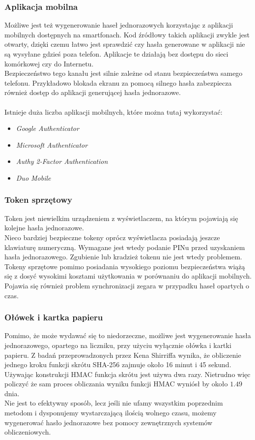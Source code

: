 \subsubsection{Aplikacja mobilna}
Możliwe jest też wygenerowanie haseł jednorazowych korzystając z aplikacji mobilnych 
dostępnych na smartfonach. Kod źródłowy takich aplikacji zwykle jest otwarty, dzięki czemu 
łatwo jest sprawdzić czy hasła generowane w aplikacji nie są wysyłane gdzieś poza telefon. 
Aplikacje te działają bez dostępu do sieci komórkowej czy do Internetu. \\
Bezpieczeństwo tego kanału jest silnie zależne od stanu bezpieczeństwa samego telefonu. 
Przykładowo blokada ekranu za pomocą silnego hasła zabezpiecza również dostęp do aplikacji generującej
hasła jednorazowe. \\ \\
Istnieje duża liczba aplikacji mobilnych, które można tutaj wykorzystać:
\begin{itemize}
	\item \textit{Google Authenticator}
	\item \textit{Microsoft Authenticator}
	\item \textit{Authy 2-Factor Authentication}
	\item \textit{Duo Mobile}
\end{itemize}

\subsubsection{Token sprzętowy}
Token jest niewielkim urządzeniem z wyświetlaczem, na którym pojawiają się kolejne hasła jednorazowe. \\
Nieco bardziej bezpieczne tokeny oprócz wyświetlacza posiadają jeszcze klawiaturę numeryczną. 
Wymagane jest wtedy podanie PINu przed uzyskaniem hasła jednorazowego. 
Zgubienie lub kradzież tokenu nie jest wtedy problemem. \\
Tokeny sprzętowe pomimo posiadania wysokiego poziomu bezpieczeństwa wiążą się z dosyć wysokimi kosztami
użytkowania w porównaniu do aplikacji mobilnych. Pojawia się również problem synchronizacji zegara 
w przypadku haseł opartych o czas.

\subsubsection{Ołówek i kartka papieru}
Pomimo, że może wydawać się to niedorzeczne, możliwe jest wygenerowanie hasła jednorazowego, opartego na liczniku, 
przy użyciu wyłącznie ołówka i kartki papieru. 
Z badań przeprowadzonych przez Kena Shirriffa \cite{pandp} wynika, że obliczenie jednego kroku funkcji skrótu SHA-256
zajmuje około 16 minut i 45 sekund. Używając konstrukcji HMAC funkcja skrótu jest używa dwa razy.
Nietrudno więc policzyć że sam proces obliczania wyniku funkcji HMAC wyniósł by około $1.49$ dnia. \\
Nie jest to efektywny sposób, lecz jeśli nie ufamy wszystkim poprzednim metodom i dysponujemy 
wystarczającą ilością wolnego czasu, możemy wygenerować hasło jednorazowe bez pomocy zewnętrznych 
systemów obliczeniowych.

